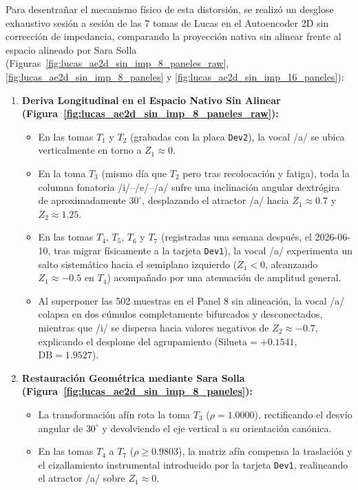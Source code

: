 \documentclass[11pt,a4paper]{article}
\begin{document}
Para desentrañar el mecanismo físico de esta distorsión, se realizó un desglose exhaustivo sesión a sesión de las 7 tomas de Lucas en el Autoencoder 2D sin corrección de impedancia, comparando la proyección nativa sin alinear frente al espacio alineado por Sara Solla (Figuras~\ref{fig:lucas_ae2d_sin_imp_8_paneles_raw}, \ref{fig:lucas_ae2d_sin_imp_8_paneles} y \ref{fig:lucas_ae2d_sin_imp_16_paneles}):
\begin{enumerate}
    \item \textbf{Deriva Longitudinal en el Espacio Nativo Sin Alinear (Figura~\ref{fig:lucas_ae2d_sin_imp_8_paneles_raw}):}
    \begin{itemize}
        \item En las tomas $T_1$ y $T_2$ (grabadas con la placa \texttt{Dev2}), la vocal /a/ se ubica verticalmente en torno a $Z_1 \approx 0$.
        \item En la toma $T_3$ (mismo día que $T_2$ pero tras recolocación y fatiga), toda la columna fonatoria /i/--/e/--/a/ sufre una inclinación angular dextrógira de aproximadamente $30^\circ$, desplazando el atractor /a/ hacia $Z_1 \approx 0.7$ y $Z_2 \approx 1.25$.
        \item En las tomas $T_4$, $T_5$, $T_6$ y $T_7$ (registradas una semana después, el 2026-06-10, tras migrar físicamente a la tarjeta \texttt{Dev1}), la vocal /a/ experimenta un salto sistemático hacia el semiplano izquierdo ($Z_1 < 0$, alcanzando $Z_1 \approx -0.5$ en $T_4$) acompañado por una atenuación de amplitud general.
        \item Al superponer las 502 muestras en el Panel 8 sin alineación, la vocal /a/ colapsa en dos cúmulos completamente bifurcados y desconectados, mientras que /i/ se dispersa hacia valores negativos de $Z_2 \approx -0.7$, explicando el desplome del agrupamiento ($\text{Silueta} = +0.1541$, $\text{DB} = 1.9527$).
    \end{itemize}
    \item \textbf{Restauración Geométrica mediante Sara Solla (Figura~\ref{fig:lucas_ae2d_sin_imp_8_paneles}):}
    \begin{itemize}
        \item La transformación afín rota la toma $T_3$ ($\rho = 1.0000$), rectificando el desvío angular de $30^\circ$ y devolviendo el eje vertical a su orientación canónica.
        \item En las tomas $T_4$ a $T_7$ ($\rho \ge 0.9803$), la matriz afín compensa la traslación y el cizallamiento instrumental introducido por la tarjeta \texttt{Dev1}, realineando el atractor /a/ sobre $Z_1 \approx 0$.

\end{itemize}
\end{enumerate}
\end{document}
